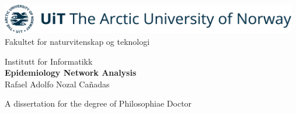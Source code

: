 \documentclass[12pt,twoside,a4paper,fleqn, english]{report}
\begin{document}
\pagestyle{empty}
\begin{center}
    \parbox[c][\textheight][t]{\textwidth}{
    
        \vspace{-2cm}
        \begin{left}

            \includegraphics[width=13cm]{figures/Others/UiT_Logo_Eng_Bla_RGB.png}\\

            \setlength{\parindent}{4em}                 %
            \vspace{0.6cm}
            \large Fakultet for naturvitenskap og teknologi \par
            \large Institutt for Informatikk \\

            \vspace{0.15cm}
            \Large \textbf{Epidemiology Network Analysis}\\

            \vspace{0.05cm}
            \normalsize Rafael Adolfo Nozal Cañadas \par  
            \normalsize A dissertation for the degree of Philosophiae Doctor  \\ \rightline{\today}
            

\end{left}}
\end{center}
\end{document}
